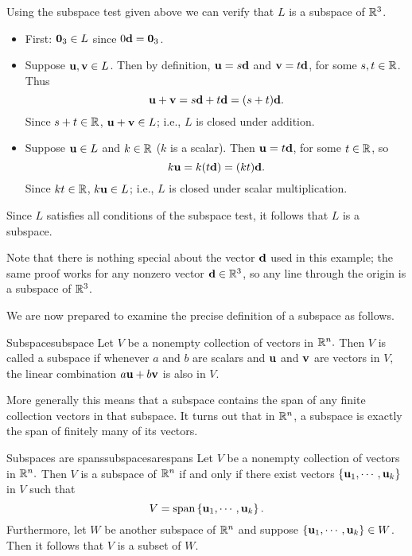 \begin{solution}
Using the subspace test given above we can verify that $L$ is a subspace of $\mathbb{R}^3$. 
\begin{itemize}
\item First: ${\bf 0}_3\in L$ since $0{\bf d}={\bf 0}_3$.
\item Suppose ${\bf u},{\bf v}\in L$.
Then by definition, ${\bf u}=s{\bf d}$ and ${\bf v}=t{\bf d}$, 
for some $s,t\in\mathbb{R}$.
Thus
\[ {\bf u}+{\bf v} = s{\bf d}+t{\bf d} = (s+t){\bf d}.\]
Since $s+t\in\mathbb{R}$, ${\bf u}+{\bf v}\in L$;
i.e., $L$ is closed under addition.
\item Suppose ${\bf u}\in L$ and $k\in\mathbb{R}$ ($k$ is a scalar).
Then ${\bf u}=t{\bf d}$, for some $t\in\mathbb{R}$, so
\[ k{\bf u}=k(t{\bf d})=(kt){\bf d}.\]
Since $kt\in\mathbb{R}$, $k{\bf u}\in L$;
i.e., $L$ is closed under scalar multiplication.
\end{itemize}
Since $L$ satisfies all conditions of the subspace test, it follows that $L$ is a subspace. 
\end{solution}

Note that there is nothing special about the vector ${\bf d}$ used
in this example; the same proof works for any nonzero
vector ${\bf d}\in\mathbb{R}^3$, so any line through the origin is
a subspace of $\mathbb{R}^3$.

We are now prepared to examine the precise definition of a subspace as follows.

\begin{definition}{Subspace}{subspace}
Let $V$ be a nonempty collection of vectors in $\mathbb{R}^{n}.$ Then
$V$ is called a subspace if whenever $a$ and $b$  are scalars and ${\bf u}$ and ${\bf v}$
are vectors in $V,$ the linear combination $a {\bf u}+ b {\bf v}$ is also in $V$.
\end{definition}

More generally this means that a subspace contains the span of any
finite collection vectors in that subspace. It turns out that in
$\mathbb{R}^{n}$, a subspace is exactly the span of finitely many of
its vectors.

\begin{theorem}{Subspaces are spans}{subspacesarespans}
Let $V$ be a nonempty collection of vectors in $\mathbb{R}^{n}.$ Then $V$ is a subspace of $\mathbb{R}^{n}$ if and only if there
exist vectors $\left\{ {\bf u}_{1},\cdots ,{\bf u}_{k}\right\}$ in $V$ such that 
\[
V= \mbox{span}\left\{ {\bf u}_{1},\cdots ,{\bf u}_{k}\right\}. 
\]
Furthermore, let $W$ be another subspace of $\mathbb{R}^n$ and suppose $\left\{ {\bf u}_{1},\cdots ,{\bf u}_{k}\right\} \in W$. Then it follows that $V$ is a subset of $W$. 
\end{theorem}

